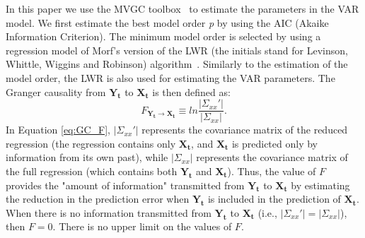 In this paper we use the MVGC toolbox~\cite{barnett2014mvgc} to estimate the parameters in the VAR model. We first estimate the best model order \emph{p} by using the AIC (Akaike Information Criterion). The minimum model order is selected by using a regression model of Morf's version of the LWR (the initials stand for Levinson, Whittle, Wiggins and Robinson) algorithm~\cite{morf1978recursive}. Similarly to the estimation of the model order, the LWR is also used for estimating the VAR parameters. The Granger causality from $\mathbf{Y_t}$ to $\mathbf{X_t}$ is then defined as:
\begin{equation} \label{eq:GC_F}
F_{\mathbf{Y_t}\rightarrow \mathbf{X_t}} \equiv ln \frac{|\Sigma_{xx}'|}{|\Sigma_{xx}|}.
\end{equation}
In Equation \eqref{eq:GC_F}, $|\Sigma_{xx}'|$ represents the covariance matrix of the reduced regression (the regression contains only $\mathbf{X_t}$, and $\mathbf{X_t}$ is predicted only by information from its own past), while $|\Sigma_{xx}|$ represents the covariance matrix of the full regression (which contains both $\mathbf{Y_t}$ and $\mathbf{X_t}$). Thus, the value of $F$ provides the "amount of information" transmitted from $\mathbf{Y_t}$ to $\mathbf{X_t}$ by estimating the reduction in the prediction error when $\mathbf{Y_t}$ is included in the prediction of $\mathbf{X_t}$. When there is no information transmitted from $\mathbf{Y_t}$ to $\mathbf{X_t}$ (i.e., $|\Sigma_{xx}'|=|\Sigma_{xx}|$), then $F=0$. There is no upper limit on the values of $F$.

